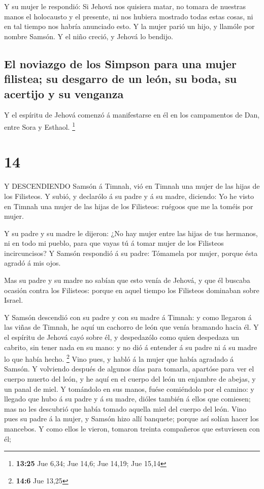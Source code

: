  Y su mujer le respondió: Si Jehová nos quisiera matar, no
tomara de nuestras manos el holocausto y el presente, ni nos hubiera
mostrado todas estas cosas, ni en tal tiempo nos habría anunciado esto.
 Y la mujer parió un hijo, y llamóle por nombre Samsón. Y
el niño creció, y Jehová lo bendijo.

\hypertarget{el-noviazgo-de-los-simpson-para-una-mujer-filistea-su-desgarro-de-un-leuxf3n-su-boda-su-acertijo-y-su-venganza}{%
\subsection{El noviazgo de los Simpson para una mujer filistea; su
desgarro de un león, su boda, su acertijo y su
venganza}\label{el-noviazgo-de-los-simpson-para-una-mujer-filistea-su-desgarro-de-un-leuxf3n-su-boda-su-acertijo-y-su-venganza}}

 Y el espíritu de Jehová comenzó á manifestarse en él en
los campamentos de Dan, entre Sora y Esthaol. \footnote{\textbf{13:25}
  Jue 6,34; Jue 14,6; Jue 14,19; Jue 15,14}

\hypertarget{section-13}{%
\section{14}\label{section-13}}

 Y DESCENDIENDO Samsón á Timnah, vió en Timnah una mujer de
las hijas de los Filisteos.  Y subió, y declarólo á su padre
y á su madre, diciendo: Yo he visto en Timnah una mujer de las hijas de
los Filisteos: ruégoos que me la toméis por mujer.

 Y su padre y su madre le dijeron: ¿No hay mujer entre las
hijas de tus hermanos, ni en todo mi pueblo, para que vayas tú á tomar
mujer de los Filisteos incircuncisos? Y Samsón respondió á su padre:
Tómamela por mujer, porque ésta agradó á mis ojos.

 Mas su padre y su madre no sabían que esto venía de Jehová,
y que él buscaba ocasión contra los Filisteos: porque en aquel tiempo
los Filisteos dominaban sobre Israel.

 Y Samsón descendió con su padre y con su madre á Timnah: y
como llegaron á las viñas de Timnah, he aquí un cachorro de león que
venía bramando hacia él.  Y el espíritu de Jehová cayó sobre
él, y despedazólo como quien despedaza un cabrito, sin tener nada en su
mano: y no dió á entender á su padre ni á su madre lo que había hecho.
\footnote{\textbf{14:6} Jue 13,25}  Vino pues, y habló á la
mujer que había agradado á Samsón.  Y volviendo después de
algunos días para tomarla, apartóse para ver el cuerpo muerto del león,
y he aquí en el cuerpo del león un enjambre de abejas, y un panal de
miel.  Y tomándolo en sus manos, fuése comiéndolo por el
camino: y llegado que hubo á su padre y á su madre, dióles también á
ellos que comiesen; mas no les descubrió que había tomado aquella miel
del cuerpo del león.  Vino pues su padre á la mujer, y
Samsón hizo allí banquete; porque así solían hacer los mancebos.
 Y como ellos le vieron, tomaron treinta compañeros que
estuviesen con él;

